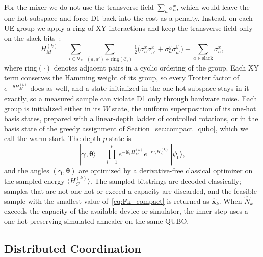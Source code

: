 For the mixer we do not use the transverse field $\sum_a\sigma^x_a$, which would leave the one-hot subspace and
force D1 back into the cost as a penalty. Instead, on each UE group we apply a ring of XY interactions and keep the
transverse field only on the slack bits~\cite{Hadfield2019}:
\begin{equation}
    H_{M}^{(k)}=\sum_{i\in\mathscr{U}_k}\ \sum_{(a,a')\in\mathrm{ring}(\mathscr{C}_i)}
    \tfrac{1}{2}\bigl(\sigma^x_a\sigma^x_{a'}+\sigma^y_a\sigma^y_{a'}\bigr)
    +\sum_{a\in\mathrm{slack}}\sigma^x_a ,
    \label{eq:HM_xy}
\end{equation}
where $\mathrm{ring}(\cdot)$ denotes adjacent pairs in a cyclic ordering of the group. Each XY term conserves the
Hamming weight of its group, so every Trotter factor of $e^{-\mathrm{i}\theta H_M^{(k)}}$ does as well, and a state
initialized in the one-hot subspace stays in it exactly, so a measured sample can violate D1 only through hardware
noise. Each group is initialized either in its $W$ state, the uniform
superposition of its one-hot basis states, prepared with a linear-depth ladder of controlled rotations, or in the
basis state of the greedy assignment of Section~\ref{sec:compact_qubo}, which we call the warm start. The depth-$p$ state is
\begin{equation}
    |\boldsymbol{\gamma},\boldsymbol{\theta}\rangle
    =\prod_{l=1}^{p}e^{-\mathrm{i}\theta_{l}H_{M}^{(k)}}e^{-\mathrm{i}\gamma_{l}H_{C}^{(k)}}\,|\psi_0\rangle,
    \label{eq:qaoa_state}
\end{equation}
and the angles $(\boldsymbol{\gamma},\boldsymbol{\theta})$ are optimized by a derivative-free classical optimizer on
the sampled energy $\langle H_C^{(k)}\rangle$. The sampled bitstrings are decoded classically; samples that are not
one-hot or exceed a capacity are discarded, and the feasible sample with the smallest value of~\eqref{eq:Fk_compact}
is returned as $\hat{\mathbf{x}}_k$. When $\hat N_k$ exceeds the capacity of the available device or simulator, the
inner step uses a one-hot-preserving simulated annealer on the same QUBO.

\subsection{Distributed Coordination}
\label{sec:admm}

